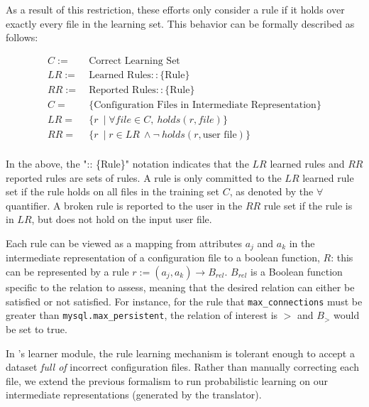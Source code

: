 As a result of this restriction, 
these efforts only consider a rule if it holds over exactly every file in 
the learning set. This behavior can be formally described as follows:
\begin{small}
\begin{align*}
C :=&\ \text{Correct Learning Set}\\
LR :=&\ \text{Learned Rules} :: \{\textrm{Rule}\}\\
RR :=&\ \text{Reported Rules} :: \{\textrm{Rule}\}\\ 
C =&\ \text{\{Configuration Files in Intermediate Representation\}}\\
LR =&\ \{ r\ \mid \forall file \in C,\ holds(r,file)\} \\
RR =&\ \{ r\ \mid r \in LR \ \land \neg\ holds(r,\textrm{user file}) \}\\
\end{align*}
\end{small}
In the above, the ":: \{Rule\}" notation indicates that the $LR$ learned rules 
and $RR$ reported rules are sets of rules.
A rule is only committed to the $LR$ learned rule set if 
the rule holds on all files in the training set $C$, as denoted by the $\forall$ quantifier. 
A broken rule is reported to the user in the $RR$ rule set if the rule is in $LR$, 
but does not hold on the input user file.

Each rule can be viewed as a mapping from 
attributes $a_j$ and $a_k$ in the intermediate representation of a 
configuration file to a boolean function, $R$: this can be represented by a rule
$r := (a_j, a_k) \rightarrow B_{rel}$.
$B_{rel}$ is a Boolean function specific to the relation to assess, meaning that 
the desired relation can either be satisfied or not satisfied. 
For instance, for the rule that {\tt max\_connections} must 
be greater than {\tt mysql.max\_persistent}, the relation of interest is $>$ 
and $B_{>}$ would be set to true.

In \app's learner module, the rule learning mechanism is tolerant 
enough to accept a dataset {\em full of} incorrect configuration files.
Rather than manually correcting each file, 
we extend the previous formalism to run probabilistic learning
on our intermediate representations (generated by the translator). 

